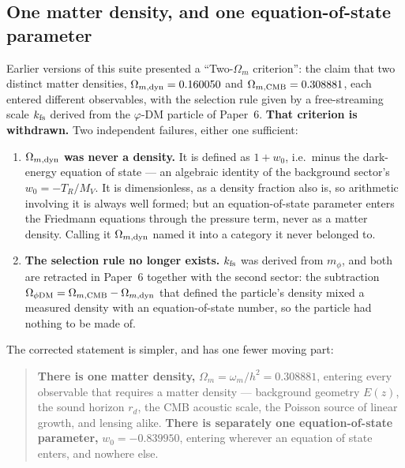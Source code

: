 \documentclass[12pt,a4paper]{article}
\begin{document}
\subsection{One matter density, and one equation-of-state parameter}
\label{sec:two_omega_m}

Earlier versions of this suite presented a ``Two-$\Omega_m$ criterion'': the
claim that two distinct matter densities, $\Omega_{m,\rm dyn}=0.160050$ and
$\Omega_{m,\rm CMB}=0.308881$, each entered different observables, with the
selection rule given by a free-streaming scale $k_{\rm fs}$ derived from the
$\varphi$-DM particle of Paper~6. \textbf{That criterion is withdrawn.} Two
independent failures, either one sufficient:

\begin{enumerate}\itemsep2pt
  \item \textbf{$\Omega_{m,\rm dyn}$ was never a density.} It is defined as
        $1+w_0$, i.e.\ minus the dark-energy equation of state --- an algebraic
        identity of the background sector's $w_0=-T_R/M_V$. It is
        dimensionless, as a density fraction also is, so arithmetic involving
        it is always well formed; but an equation-of-state parameter enters
        the Friedmann equations through the pressure term, never as a matter
        density. Calling it $\Omega_{m,\rm dyn}$ named it into a category it
        never belonged to.
  \item \textbf{The selection rule no longer exists.} $k_{\rm fs}$ was derived
        from $m_\phi$, and both are retracted in Paper~6 together with the
        second sector: the subtraction
        $\Omega_{\phi\rm DM}=\Omega_{m,\rm CMB}-\Omega_{m,\rm dyn}$ that
        defined the particle's density mixed a measured density with an
        equation-of-state number, so the particle had nothing to be made of.
\end{enumerate}

The corrected statement is simpler, and has one fewer moving part:

\begin{quote}
\textbf{There is one matter density,}
$\Omega_m = \omega_m/h^2 = 0.308881$, entering every observable that requires a
matter density --- background geometry $E(z)$, the sound horizon $r_d$, the CMB
acoustic scale, the Poisson source of linear growth, and lensing alike.
\textbf{There is separately one equation-of-state parameter,} $w_0=-0.839950$,
entering wherever an equation of state enters, and nowhere else.
\end{quote}
\end{document}
